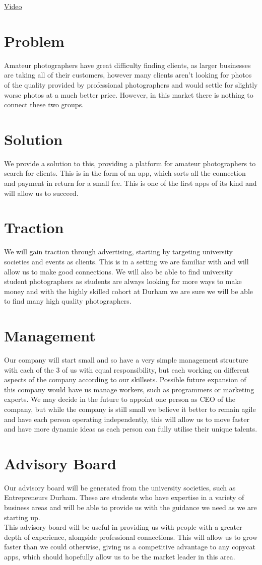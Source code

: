 \documentclass{article}[18pt]
\begin{document}
\begin{center}
\underline{\huge Video}
\end{center}
\section{Problem}
Amateur photographers have great difficulty finding clients, as larger businesses are taking all of their customers, however many clients aren't looking for photos of the quality provided by professional photographers and would settle for slightly worse photos at a much better price. However, in this market there is nothing to connect these two groups.  
\section{Solution}
We provide a solution to this, providing a platform for amateur photographers to search for clients. This is in the form of an app, which sorts all the connection and payment in return for a small fee. This is one of the first apps of its kind and will allow us to succeed. 
\section{Traction}
We will gain traction through advertising, starting by targeting university societies and events as clients. This is in a setting we are familiar with and will allow us to make good connections. We will also be able to find university student photographers as students are always looking for more ways to make money and with the highly skilled cohort at Durham we are sure we will be able to find many high quality photographers.
\section{Management}
Our company will start small and so have a very simple management structure with each of the 3 of us with equal responsibility, but each working on different aspects of the company according to our skillsets. Possible future expansion of this company would have us manage workers, such as programmers or marketing experts. We may decide in the future to appoint one person as CEO of the company, but while the company is still small we believe it better to remain agile and have each person operating independently, this will allow us to move faster and have more dynamic ideas as each person can fully utilise their unique talents.
\section{Advisory Board}
Our advisory board will be generated from the university societies, such as Entrepreneurs Durham. These are students who have expertise in a variety of business areas and will be able to provide us with the guidance we need as we are starting up.\\
This advisory board will be useful in providing us with people with a greater depth of experience, alongside professional connections. This will allow us to grow faster than we could otherwise, giving us a competitive advantage to any copycat apps, which should hopefully allow us to be the market leader in this area.
\end{document}
